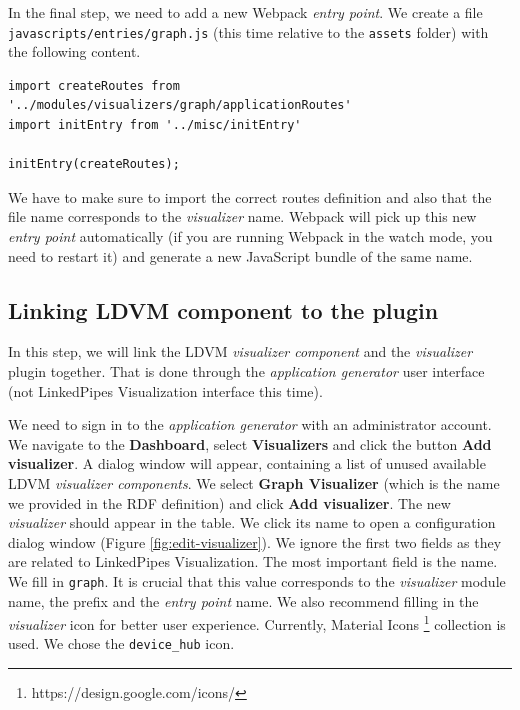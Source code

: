 In the final step, we need to add a new Webpack \emph{entry point}. We create a file \texttt{javascripts/entries/graph.js} (this time relative to the \texttt{assets} folder) with the following content. 

\begin{verbatim}
import createRoutes from '../modules/visualizers/graph/applicationRoutes'
import initEntry from '../misc/initEntry'

initEntry(createRoutes);
\end{verbatim}

We have to make sure to import the correct routes definition and also that the file name corresponds to the \emph{visualizer} name. Webpack will pick up this new \emph{entry point} automatically (if you are running Webpack in the watch mode, you need to restart it) and generate a new JavaScript bundle of the same name.

\subsection{Linking LDVM component to the plugin}

In this step, we will link the LDVM \emph{visualizer component} and the \emph{visualizer} plugin together. That is done through the \emph{application generator} user interface (not LinkedPipes Visualization interface this time).

We need to sign in to the \emph{application generator} with an administrator account. We navigate to the \textbf{Dashboard}, select \textbf{Visualizers} and click the button \textbf{Add visualizer}. A dialog window will appear, containing a list of unused available LDVM \emph{visualizer components}. We select \textbf{Graph Visualizer} (which is the name we provided in the RDF definition)  and click \textbf{Add visualizer}. The new \emph{visualizer} should appear in the table. We click its name to open a configuration dialog window (Figure \ref{fig:edit-visualizer}). We ignore the first two fields as they are related to LinkedPipes Visualization. The most important field is the name. We fill in \texttt{graph}. It is crucial that this value corresponds to the \emph{visualizer} module name, the prefix and the \emph{entry point} name. We also recommend filling in the \emph{visualizer} icon for better user experience. Currently, Material Icons \footnote{https://design.google.com/icons/} collection is used. We chose the \texttt{device\_hub} icon.

